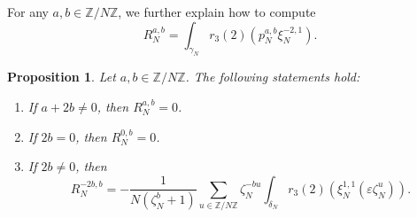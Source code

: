 \documentclass[11pt,a4,leqno]{amsart}
\theoremstyle{my theoremstyle}
\newtheorem{prop}[thm]{Proposition}
\theoremstyle{dfn}
\theoremstyle{remark}
\renewcommand{\1}{\mathbbm{1}}
\newcommand{\Z}{\mathbb{Z}}
\newcommand{\e}{\varepsilon}
\numberwithin{equation}{section}
\begin{document}
For any $a,b \in \Z/N\Z$, we further explain how to compute
\begin{equation*}
    R_N^{a,b} = \int_{\gamma_N} r_3(2)(p_N^{a,b} \xi_N^{-2,1}).
\end{equation*}

\begin{prop}\label{prop:regR}
Let $a,b \in \Z/N\Z$. The following statements hold:
\begin{enumerate}
    \item If $a+2b \neq 0$, then $R_N^{a,b} = 0$.
    \item If $2b=0$, then $R_N^{0,b}=0$.
    \item If $2b \neq 0$, then
    \begin{equation*}
        R_N^{-2b, b} = - \frac{1}{N(\zeta_N^b + 1)} \sum_{u \in \Z/N\Z} \zeta_N^{-bu} \int_{\delta_N} r_3(2)(\xi_N^{1,1}(\e \zeta_N^u)).
    \end{equation*}
\end{enumerate}
\end{prop}
\end{document}
